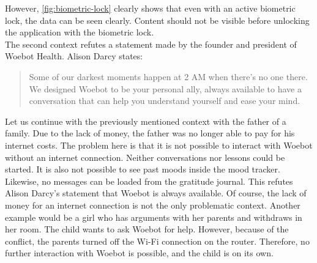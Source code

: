 However, \autoref{fig:biometric-lock} clearly shows that even with an active biometric lock, the data can be seen clearly.
Content should not be visible before unlocking the application with the biometric lock.\\

The second context refutes a statement made by the founder and president of Woebot Health.
Alison Darcy states\cite{woebot-about}:
\begin{quote}
    Some of our darkest moments happen at 2 AM when there's no one there.
    We designed Woebot to be your personal ally, always available to have a conversation that can help you understand yourself and ease your mind.
\end{quote}
Let us continue with the previously mentioned context with the father of a family.
Due to the lack of money, the father was no longer able to pay for his internet costs.
The problem here is that it is not possible to interact with Woebot without an internet connection.
Neither conversations nor lessons could be started.
It is also not possible to see past moods inside the mood tracker.
Likewise, no messages can be loaded from the gratitude journal.
This refutes Alison Darcy's statement that Woebot is always available.
Of course, the lack of money for an internet connection is not the only problematic context.
Another example would be a girl who has arguments with her parents and withdraws in her room.
The child wants to ask Woebot for help. However, because of the conflict, the parents turned off the Wi-Fi connection on the router.
Therefore, no further interaction with Woebot is possible, and the child is on its own.

